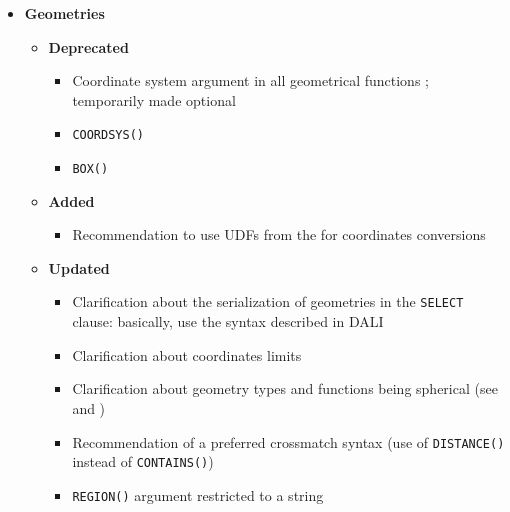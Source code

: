 \documentclass[11pt,a4paper]{ivoa}
\begin{document}
\begin{itemize}
\begin{itemize}
\begin{itemize}
                \end{itemize}
        \end{itemize}
    \item \textbf{Geometries}
        \begin{itemize}
            \item \textbf{Deprecated}
                \begin{itemize}
                    \item Coordinate system argument in all geometrical
                          functions ; temporarily made optional
                    \item \verb:COORDSYS(): 
                    \item \verb:BOX(): 
                \end{itemize}
            \item \textbf{Added}
                \begin{itemize}
                    \item Recommendation to use UDFs from the \CatalogueUDF{}
                          for coordinates conversions
                \end{itemize}
            \item \textbf{Updated}
                \begin{itemize}
                    \item Clarification about the serialization of geometries in
                          the \verb:SELECT: clause: basically, use the syntax
                          described in DALI 
                    \item Clarification about coordinates limits
                    \item Clarification about geometry types and functions being
                          spherical
                          (see  and
                          )
                    \item Recommendation of a preferred crossmatch syntax (use
                          of \verb:DISTANCE(): instead of \verb:CONTAINS():)
                    \item \verb:REGION(): argument restricted to a string

\end{itemize}
\end{itemize}
\end{itemize}
\end{document}
